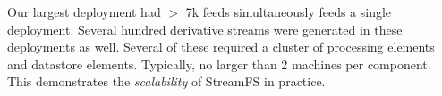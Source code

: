 Our largest deployment had $>$ 7k feeds simultaneously feeds a single deployment.  Several hundred derivative streams were generated
in these deployments as well.  Several of these required a cluster of processing elements and datastore elements.  Typically, no larger
than 2 machines per component.  This demonstrates the \emph{scalability} of StreamFS in practice.

